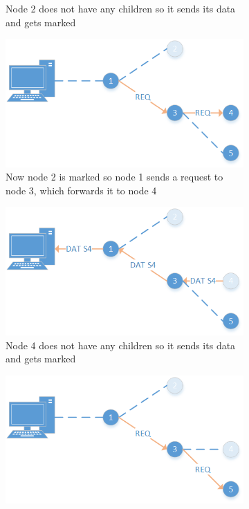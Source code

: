 \begin{figure}[htbp]
\begin{subfigure}[t]{0.4\textwidth}
        \caption{Node 2 does not have any children so it sends its data and gets marked}
        \label{fig:link}
    \end{subfigure}
    \quad
    \quad
    \begin{subfigure}[t]{0.4\textwidth}
		\centering         
        \includegraphics[scale=0.6]{content/images/Collection/Part3}
        \caption{Now node 2 is marked so node 1 sends a request to node 3, which forwards it to node 4}
        \label{fig:link}
    \end{subfigure}
    \quad
    \quad
    \begin{subfigure}[t]{0.4\textwidth}
		\centering         
        \includegraphics[scale=0.6]{content/images/Collection/Part4}
        \caption{Node 4 does not have any children so it sends its data and gets marked}
        \label{fig:link}
    \end{subfigure}
    \quad
    \quad
    \begin{subfigure}[t]{0.4\textwidth}
		\centering         
        \includegraphics[scale=0.6]{content/images/Collection/Part5}

\end{subfigure}
\end{figure}
